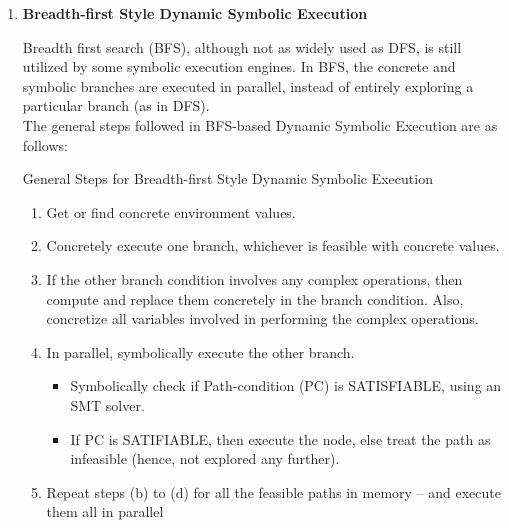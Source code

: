 \documentclass[11pt]{llncs}
\begin{document}
\begin{enumerate}
				\vspace{8mm}

				
				\item \textbf{Breadth-first Style Dynamic Symbolic Execution} 
				\vspace{1mm}

				Breadth first search (BFS), although not as widely used as DFS, is still utilized by some symbolic execution engines. In BFS, the concrete and symbolic branches are executed in parallel, instead of entirely exploring a particular branch (as in DFS).\cite{1_Search_Strategies_DSE}\\

				The general steps followed in BFS-based Dynamic Symbolic Execution are as follows:\\
				
				\vspace{-3mm}

				\begin{algorithm}[H]
					\caption{General Steps for Breadth-first Style Dynamic Symbolic Execution}  \label{algorithm_3}
					
					\DontPrintSemicolon
					\SetAlgoLined
					
					
					\vspace{2mm}

					\begin{enumerate}
						\item Get or find concrete environment values.
						\item Concretely execute one branch, whichever is feasible with concrete values.
						\item If the other branch condition involves any complex operations, then compute and replace them concretely in the branch condition. Also, concretize all variables involved in performing the complex operations.
						\item In parallel, symbolically execute the other branch.
							\begin{itemize}
								\item Symbolically check if Path-condition (PC) is SATISFIABLE, using an SMT solver.
								\item If PC is SATIFIABLE, then execute the node, else treat the path as infeasible (hence, not explored any further).
							\end{itemize}
						\item Repeat steps (b) to (d) for all the feasible paths in memory – and execute them all in parallel
					\end{enumerate}
				\end{algorithm}
				~


\end{enumerate}
\end{document}
